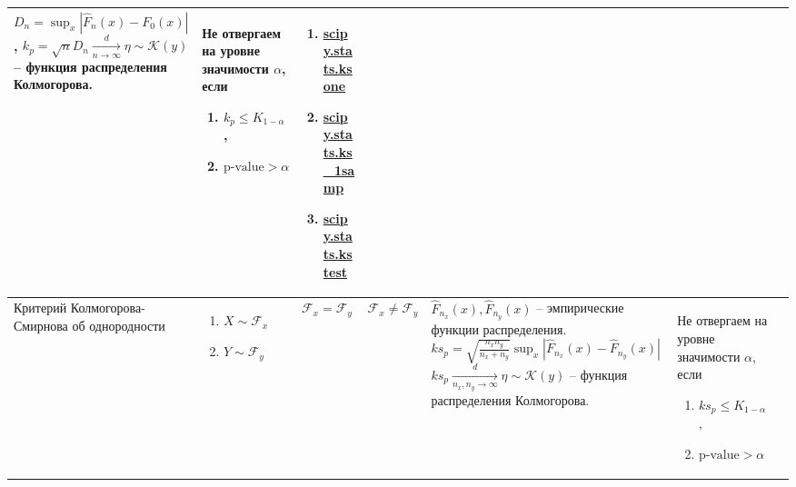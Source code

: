 \documentclass[14pt, a1paper, fleqn]{extarticle}
\begin{document}
\begin{center}
\begin{tabular}{|p{6cm}|p{8cm}|p{3cm}|p{3cm}|p{9cm}|p{10cm}|p{14cm}|}
            \newline
            \( D_n = \sup_x \left| \widehat{F}_n (x) - F_0 (x) \right| \),
            \newline
            \( k_p = \sqrt{n} D_n \xrightarrow[n \to \infty]{d} \eta \sim \mathcal{K}(y) \) -- функция распределения Колмогорова.
            & Не отвергаем на уровне значимости \( \alpha \), если 
            \begin{enumerate}
                \item \( k_p \leq K_{1-\alpha} \),
                \item \( \text{p-value} > \alpha \)
            \end{enumerate} 
            & \begin{enumerate}
                \item \href{https://docs.scipy.org/doc/scipy/reference/generated/scipy.stats.ksone.html}{scipy.stats.ksone}
                \item \href{https://docs.scipy.org/doc/scipy/reference/generated/scipy.stats.ks_1samp.html}{scipy.stats.ks\_1samp}
                \item \href{https://docs.scipy.org/doc/scipy/reference/generated/scipy.stats.kstest.html}{scipy.stats.kstest}
            \end{enumerate} \\
            \hline
            Критерий Колмогорова-Смирнова об однородности
            & \begin{enumerate}
             \item \( X \sim \mathcal{F}_x \)
             \item \( Y \sim \mathcal{F}_y \)
            \end{enumerate} 
            & \( \mathcal{F}_x = \mathcal{F}_y \) 
            & \( \mathcal{F}_x \neq \mathcal{F}_y \) 
            & \( \widehat{F}_{n_x} (x), \widehat{F}_{n_y} (x) \) -- эмпирические функции распределения.
            \newline
            \( ks_p = \sqrt{\frac{n_x n_y}{n_x + n_y}} \sup_x \left| \widehat{F}_{n_x} (x) - \widehat{F}_{n_y} (x) \right|\) 
            \( ks_p \xrightarrow[n_x, n_y \to \infty]{d} \eta \sim \mathcal{K}(y) \) -- функция распределения Колмогорова.
            & Не отвергаем на уровне значимости \( \alpha \), если 
            \begin{enumerate}
                \item \( ks_p \leq K_{1-\alpha} \),
                \item \( \text{p-value} > \alpha \)

\end{enumerate}
\end{tabular}
\end{center}
\end{document}
